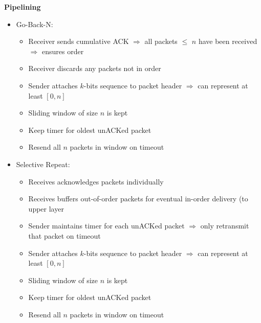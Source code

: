 \documentclass[a4paper]{article} \usepackage[backend=biber, style=numeric, sorting=none]{biblatex}
\begin{document}
\begin{multicols*}{4}
\textbf{Pipelining}
\begin{itemize}[leftmargin=*]
\item Go-Back-N:
  \begin{itemize}[leftmargin=*]
  \item Receiver sends cumulative ACK $\Rightarrow$ all packets $\leq$ $n$ have been received $\Rightarrow$ ensures order
  \item Receiver discards any packets not in order
  \item Sender attaches $k$-bits sequence to packet header $\Rightarrow$ can represent at least $[0, n]$
  \item Sliding window of size $n$ is kept
  \item Keep timer for oldest unACKed packet
  \item Resend all $n$ packets in window on timeout
  \end{itemize}
\item Selective Repeat:
  \begin{itemize}[leftmargin=*]
    \item Receives acknowledges packets individually
    \item Receives buffers out-of-order packets for eventual in-order delivery (to upper layer 
    \item Sender maintains timer for each unACKed packet $\Rightarrow$ only retransmit that packet on timeout
    \item Sender attaches $k$-bits sequence to packet header $\Rightarrow$ can represent at least $[0, n]$
    \item Sliding window of size $n$ is kept
    \item Keep timer for oldest unACKed packet
    \item Resend all $n$ packets in window on timeout
  \end{itemize}
\end{itemize}


\end{multicols*}
\end{document}
